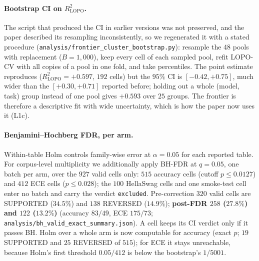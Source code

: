 \documentclass[11pt]{article}
\begin{document}
\paragraph{Bootstrap CI on $R^2_{\text{LOPO}}$.} The script that produced the CI in earlier versions was not preserved, and the paper described its resampling inconsistently, so we regenerated it with a stated procedure (\texttt{analysis/\allowbreak frontier\_\allowbreak cluster\_\allowbreak bootstrap.\allowbreak py}): resample the $48$ pools with replacement ($B{=}1{,}000$), keep every cell of each sampled pool, refit LOPO-CV with all copies of a pool in one fold, and take percentiles. The point estimate reproduces ($R^2_{\text{LOPO}}{=}{+}0.597$, $192$ cells) but the $95\%$ CI is $[{-}0.42, {+}0.75]$, much wider than the $[{+}0.30, {+}0.71]$ reported before; holding out a whole (model, task) group instead of one pool gives ${+}0.593$ over $25$ groups. The frontier is therefore a descriptive fit with wide uncertainty, which is how the paper now uses it (L1c).

\paragraph{Benjamini--Hochberg FDR, per arm.} Within-table Holm controls family-wise error at $\alpha{=}0.05$ for each reported table. For corpus-level multiplicity we additionally apply BH-FDR \citep{bh1995} at $q{=}0.05$, one batch per arm, over the $927$ valid cells only: $515$ accuracy cells (cutoff $p{\leq}0.0127$) and $412$ ECE cells ($p{\leq}0.028$); the $100$ HellaSwag cells and one smoke-test cell enter no batch and carry the verdict \texttt{excluded}. Pre-correction $320$ valid cells are SUPPORTED ($34.5\%$) and $138$ REVERSED ($14.9\%$); \textbf{post-FDR $258$ ($27.8\%$) and $122$ ($13.2\%$)} (accuracy $83/49$, ECE $175/73$; \texttt{analysis/\allowbreak bh\_\allowbreak valid\_\allowbreak exact\_\allowbreak summary.\allowbreak json}). A cell keeps its CI verdict only if it passes BH. Holm over a whole arm is now computable for accuracy (exact $p$; $19$ SUPPORTED and $25$ REVERSED of $515$); for ECE it stays unreachable, because Holm's first threshold $0.05/412$ is below the bootstrap's $1/5001$.
\end{document}
